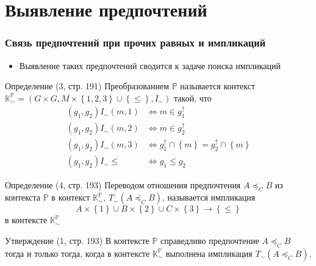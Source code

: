 \documentclass{beamer}
\newcommand{\obj}[1]{\left\{ #1 \right \}}
\newcommand{\brac}[1]{\left ( #1 \right )}
\begin{document}
\section{Выявление предпочтений} %
\label{sec:preference_mining}

\begin{frame}\frametitle{Связь предпочтений при прочих равных и импликаций}
  \begin{itemize}
    \item Выявление таких предпочтений сводится к задаче поиска импликаций
  \end{itemize}
  \begin{block}{Определение (3, стр. 191)}
    Преобразованием $\mathbb{P}$ называется контекст $\mathbb{K}^\mathbb{P}_\sim = \brac{ G\times G, M\times\obj{1,2,3}\cup \obj{\leq}, I_\sim}$ такой, что \begin{align*}
      (g_1, g_2) I_\sim (m, 1) &\Leftrightarrow m\in g_1^\uparrow\\
      (g_1, g_2) I_\sim (m, 2) &\Leftrightarrow m\in g_2^\uparrow\\
      (g_1, g_2) I_\sim (m, 3) &\Leftrightarrow g_1^\uparrow \cap \obj{m} = g_2^\uparrow \cap \obj{m}\\
      (g_1, g_2) I_\sim \leq &\Leftrightarrow g_1 \leq g_2
    \end{align*}
  \end{block}
\end{frame}

\begin{frame}
  \begin{block}{Определение (4, стр. 193)}
    Переводом отношения предпочтения $A\preceq_C B$ из контекста $\mathbb{P}$ в контекст $\mathbb{K}^\mathbb{P}_\sim$, $T_\sim\brac{A\preceq_C B}$, называется импликация \[A\times \obj{1} \cup B\times \obj{2} \cup C\times \obj{3} \rightarrow \obj{\leq}\] в контексте $\mathbb{K}^\mathbb{P}_\sim$
  \end{block}
  \begin{block}{Утверждение (1, стр. 193)}
    В контексте $\mathbb{P}$ справедливо предпочтение $A\preceq_C B$ тогда и только тогда, когда в контексте $\mathbb{K}^\mathbb{P}_\sim$ выполнена импликация $T_\sim\brac{A\preceq_C B}$.
  \end{block}
\end{frame}
\end{document}

